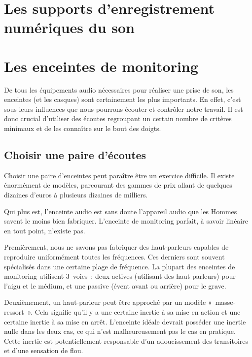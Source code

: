 \documentclass[
]{book}
\begin{document}
\hypertarget{les-supports-denregistrement-numuxe9riques-du-son}{%
\chapter{Les supports d'enregistrement numériques du son}\label{les-supports-denregistrement-numuxe9riques-du-son}}

\hypertarget{les-enceintes-de-monitoring}{%
\chapter{Les enceintes de monitoring}\label{les-enceintes-de-monitoring}}

De tous les équipements audio nécessaires pour réaliser une prise de son, les enceintes (et les casques) sont certainement les plus importants. En effet, c'est sous leurs influences que nous pourrons écouter et contrôler notre travail. Il est donc crucial d'utiliser des écoutes regroupant un certain nombre de critères minimaux et de les connaître sur le bout des doigts.

\hypertarget{choisir-une-paire-duxe9coutes}{%
\section{Choisir une paire d'écoutes}\label{choisir-une-paire-duxe9coutes}}

Choisir une paire d'enceintes peut paraître être un exercice difficile. Il existe énormément de modèles, parcourant des gammes de prix allant de quelques dizaines d'euros à plusieurs dizaines de milliers.

Qui plus est, l'enceinte audio est sans doute l'appareil audio que les Hommes savent le moins bien fabriquer. L'enceinte de monitoring parfait, à savoir linéaire en tout point, n'existe pas.

Premièrement, nous ne savons pas fabriquer des haut-parleurs capables de reproduire uniformément toutes les fréquences. Ces derniers sont souvent spécialisés dans une certaine plage de fréquence. La plupart des enceintes de monitoring utilisent 3~voies~: deux actives (utilisant des haut-parleurs) pour l'aigu et le médium, et une passive (évent avant ou arrière) pour le grave.

Deuxièmement, un haut-parleur peut être approché par un modèle «~masse-ressort~». Cela signifie qu'il y a une certaine inertie à sa mise en action et une certaine inertie à sa mise en arrêt. L'enceinte idéale devrait posséder une inertie nulle dans les deux cas, ce qui n'est malheureusement pas le cas en pratique. Cette inertie est potentiellement responsable d'un adoucissement des transitoires et d'une sensation de flou.
\end{document}
